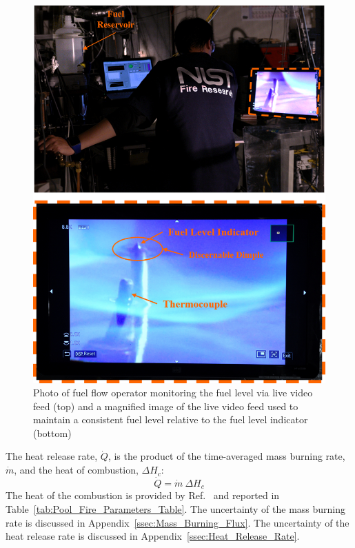 \documentclass[12pt]{article}
\begin{document}
\begin{figure}[h!]
	\centering
\includegraphics[width=14.0cm,keepaspectratio]{Monitoring_Fuel_Level_A.png}
	\caption[Photo of fuel flow operator monitoring the fuel level via live video feed (top) and a magnified image of the live video feed used to maintain a consistent fuel level relative to the fuel level indicator (bottom)]{Photo of fuel flow operator monitoring the fuel level via live video feed (top) and a magnified image of the live video feed used to maintain a consistent fuel level relative to the fuel level indicator (bottom)}
	\label{fig:Fuel_Level}
\end{figure}



The heat release rate, $\dot{Q}$, is the product of the time-averaged mass burning rate, $\dot{m}$, and the heat of combustion, $\Delta H_{c}$:
\begin{equation}\label{eq:Heat_release_rate}
\dot{Q}= \dot{m}~\Delta H_{c}
\end{equation}
The heat of the combustion is provided by Ref.~\cite{Dippr} and reported in Table~\ref{tab:Pool_Fire_Parameters_Table}. The uncertainty of the mass burning rate is discussed in Appendix~\ref{ssec:Mass_Burning_Flux}. The uncertainty of the heat release rate is discussed in Appendix~\ref{ssec:Heat_Release_Rate}.
\end{document}
